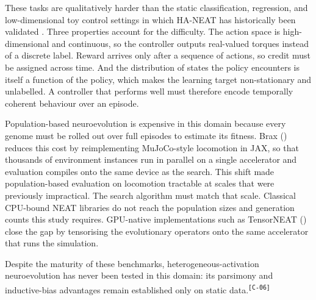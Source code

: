 \documentclass[12pt]{article}
\newcommand{\revID}[1]{\textsuperscript{\scriptsize\texttt{[#1]}}}
\newcommand{\revWeak}[2]{\textcolor{revOrange}{#2}\revID{#1}}
\begin{document}
These tasks are qualitatively harder than the static classification, regression, and low-dimensional toy control settings in which HA-NEAT has historically been validated \cite{hagg_evolving_2017}.
Three properties account for the difficulty.
The action space is high-dimensional and continuous, so the controller outputs real-valued torques instead of a discrete label.
Reward arrives only after a sequence of actions, so credit must be assigned across time.
And the distribution of states the policy encounters is itself a function of the policy, which makes the learning target non-stationary and unlabelled.
A controller that performs well must therefore encode temporally coherent behaviour over an episode.

Population-based neuroevolution is expensive in this domain because every genome must be rolled out over full episodes to estimate its fitness.
Brax (\cite{freeman_brax_2021}) reduces this cost by reimplementing MuJoCo-style locomotion in JAX, so that thousands of environment instances run in parallel on a single accelerator and evaluation compiles onto the same device as the search.
This shift made population-based evaluation on locomotion tractable at scales that were previously impractical.
The search algorithm must match that scale.
Classical CPU-bound NEAT libraries do not reach the population sizes and generation counts this study requires.
GPU-native implementations such as TensorNEAT (\cite{wang_tensorized_2024}) close the gap by tensorising the evolutionary operators onto the same accelerator that runs the simulation.

\revWeak{C-06}{Despite the maturity of these benchmarks, heterogeneous-activation neuroevolution has never been tested in this domain: its parsimony and inductive-bias advantages remain established only on static data.}


\end{document}
